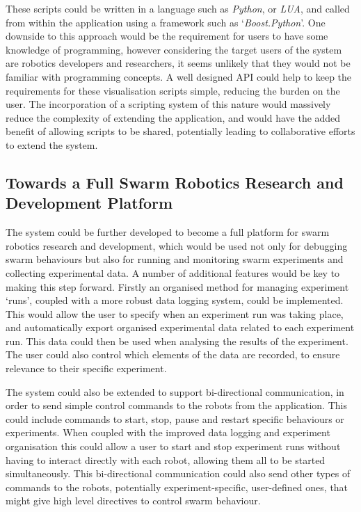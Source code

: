 These scripts could be written in a language such as \textit{Python}, or \textit{LUA}, and called from within the application using a framework such as `\textit{Boost.Python}'. One downside to this approach would be the requirement for users to have some knowledge of programming, however considering the target users of the system are robotics developers and researchers, it seems unlikely that they would not be familiar with programming concepts. A well designed API could help to keep the requirements for these visualisation scripts simple, reducing the burden on the user. The incorporation of a scripting system of this nature would massively reduce the complexity of extending the application, and would have the added benefit of allowing scripts to be shared, potentially leading to collaborative efforts to extend the system.


\subsection{Towards a Full Swarm Robotics Research and Development Platform}

The system could be further developed to become a full platform for swarm robotics research and development, which would be used not only for debugging swarm behaviours but also for running and monitoring swarm experiments and collecting experimental data. A number of additional features would be key to making this step forward. Firstly an organised method for managing experiment `runs', coupled with a more robust data logging system, could be implemented. This would allow the user to specify when an experiment run was taking place, and automatically export organised experimental data related to each experiment run. This data could then be used when analysing the results of the experiment. The user could also control which elements of the data are recorded, to ensure relevance to their specific experiment.

The system could also be extended to support bi-directional communication, in order to send simple control commands to the robots from the application. This could include commands to start, stop, pause and restart specific behaviours or experiments. When coupled with the improved data logging and experiment organisation this could allow a user to start and stop experiment runs without having to interact directly with each robot, allowing them all to be started simultaneously. This bi-directional communication could also send other types of commands to the robots, potentially experiment-specific, user-defined ones, that might give high level directives to control swarm behaviour.

